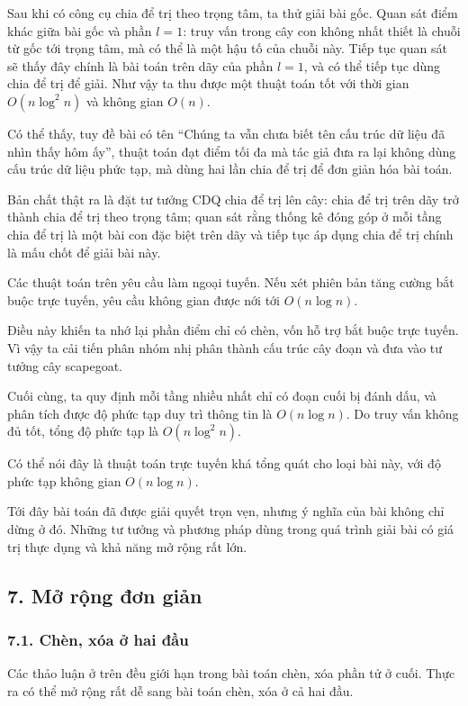 \documentclass[11pt]{article}
\begin{document}
Sau khi có công cụ chia để trị theo trọng tâm, ta thử giải bài gốc. Quan sát
điểm khác giữa bài gốc và phần \(l=1\): truy vấn trong cây con không nhất
thiết là chuỗi từ gốc tới trọng tâm, mà có thể là một hậu tố của chuỗi này.
Tiếp tục quan sát sẽ thấy đây chính là bài toán trên dãy của phần \(l=1\), và
có thể tiếp tục dùng chia để trị để giải. Như vậy ta thu được một thuật toán
tốt với thời gian \(O(n\log^2 n)\) và không gian \(O(n)\).

Có thể thấy, tuy đề bài có tên ``Chúng ta vẫn chưa biết tên cấu trúc dữ liệu
đã nhìn thấy hôm ấy'', thuật toán đạt điểm tối đa mà tác giả đưa ra lại không
dùng cấu trúc dữ liệu phức tạp, mà dùng hai lần chia để trị để đơn giản hóa
bài toán.

Bản chất thật ra là đặt tư tưởng CDQ chia để trị lên cây: chia để trị trên dãy
trở thành chia để trị theo trọng tâm; quan sát rằng thống kê đóng góp ở mỗi
tầng chia để trị là một bài con đặc biệt trên dãy và tiếp tục áp dụng chia để
trị chính là mấu chốt để giải bài này.

Các thuật toán trên yêu cầu làm ngoại tuyến. Nếu xét phiên bản tăng cường bắt
buộc trực tuyến, yêu cầu không gian được nới tới \(O(n\log n)\).

Điều này khiến ta nhớ lại phần điểm chỉ có chèn, vốn hỗ trợ bắt buộc trực
tuyến. Vì vậy ta cải tiến phân nhóm nhị phân thành cấu trúc cây đoạn và đưa
vào tư tưởng cây scapegoat.

Cuối cùng, ta quy định mỗi tầng nhiều nhất chỉ có đoạn cuối bị đánh dấu, và
phân tích được độ phức tạp duy trì thông tin là \(O(n\log n)\). Do truy vấn
không đủ tốt, tổng độ phức tạp là \(O(n\log^2 n)\).

Có thể nói đây là thuật toán trực tuyến khá tổng quát cho loại bài này, với
độ phức tạp không gian \(O(n\log n)\).

Tới đây bài toán đã được giải quyết trọn vẹn, nhưng ý nghĩa của bài không chỉ
dừng ở đó. Những tư tưởng và phương pháp dùng trong quá trình giải bài có giá
trị thực dụng và khả năng mở rộng rất lớn.

\subsection*{7. Mở rộng đơn giản}

\subsubsection*{7.1. Chèn, xóa ở hai đầu}

Các thảo luận ở trên đều giới hạn trong bài toán chèn, xóa phần tử ở cuối.
Thực ra có thể mở rộng rất dễ sang bài toán chèn, xóa ở cả hai đầu.
\end{document}
